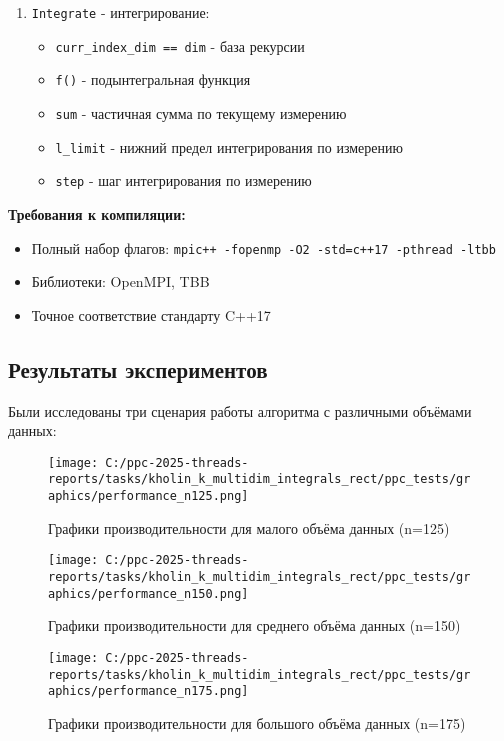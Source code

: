 \documentclass[14pt,a4paper]{article}
\begin{document}
\begin{enumerate}
\item \texttt{Integrate} - интегрирование:
  \begin{itemize}
  \item \texttt{curr\_index\_dim == dim} - база рекурсии
  \item \texttt{f()} - подынтегральная функция
  \item \texttt{sum} - частичная сумма по текущему измерению
  \item \texttt{l\_limit} - нижний предел интегрирования по измерению
  \item \texttt{step} - шаг интегрирования по измерению
  \end{itemize}
\end{enumerate}

\textbf{Требования к компиляции:}
\begin{itemize}
\item Полный набор флагов: \texttt{mpic++ -fopenmp -O2 -std=c++17 -pthread -ltbb}
\item Библиотеки: OpenMPI, TBB
\item Точное соответствие стандарту C++17
\end{itemize}

\subsection{Результаты экспериментов}
Были исследованы три сценария работы алгоритма с различными объёмами данных:

\begin{figure}[H]
\centering
\texttt{[image: C:/ppc-2025-threads-reports/tasks/kholin\_k\_multidim\_integrals\_rect/ppc\_tests/graphics/performance\_n125.png]}
\caption{Графики производительности для малого объёма данных (n=125)}
\label{fig:small}
\end{figure}

\begin{figure}[H]
\centering
\texttt{[image: C:/ppc-2025-threads-reports/tasks/kholin\_k\_multidim\_integrals\_rect/ppc\_tests/graphics/performance\_n150.png]}
\caption{Графики производительности для среднего объёма данных (n=150)}
\label{fig:medium}
\end{figure}

\begin{figure}[H]
\centering
\texttt{[image: C:/ppc-2025-threads-reports/tasks/kholin\_k\_multidim\_integrals\_rect/ppc\_tests/graphics/performance\_n175.png]}
\caption{Графики производительности для большого объёма данных (n=175)}
\label{fig:large}
\end{figure}
\end{document}
